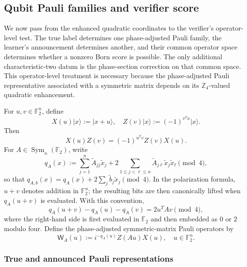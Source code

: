 \documentclass[11pt]{article}
\newcommand{\F}{\mathbb F}
\newcommand{\Sym}{\operatorname{Sym}}
\newcommand{\1}{\mathbf 1}
\newcommand{\ket}[1]{\lvert #1\rangle}
\theoremstyle{plain}
\theoremstyle{definition}
\theoremstyle{remark}
\begin{document}
\subsection{Qubit Pauli families and verifier score}
\label{subsec:integrated-qubit-verifier}
We now pass from the enhanced quadratic coordinates to the verifier's
operator-level test.  The true label determines one phase-adjusted Pauli
family, the learner's announcement determines another, and their common
operator space determines whether a nonzero Born score is possible.  The only
additional characteristic-two datum is the phase-section correction on that
common space.  This operator-level treatment is necessary because the
phase-adjusted Pauli representative associated with a symmetric matrix depends
on its $\mathbb Z_4$-valued quadratic enhancement.

For $u,v\in\F_2^n$, define
\begin{equation}
 X(u)\ket{x}:=\ket{x+u},
 \quad
 Z(v)\ket{x}:=(-1)^{v^Tx}\ket{x}.
 \label{eq:integrated-qubit-XZ}
\end{equation}
Then
\begin{equation}
 X(u)Z(v)=(-1)^{u^Tv}Z(v)X(u).
 \label{eq:integrated-qubit-XZ-commutation}
\end{equation}
For $A\in\Sym_n(\F_2)$, write
\begin{equation}
 q_A(x):=
 \sum_{j=1}^n \widetilde A_{jj}\widetilde x_j
 +2\sum_{1\le j<\ell\le n}
   \widetilde A_{j\ell}\widetilde x_j\widetilde x_\ell
 \pmod4,
 \label{eq:integrated-qubit-phase-section-enhancement}
\end{equation}
so that
$q_{A,b}(x)=q_A(x)+2\sum_j\widetilde b_j\widetilde x_j\pmod4$.
In the polarization formula, $u+v$ denotes addition in $\F_2^n$; the
resulting bits are then canonically lifted when $q_A(u+v)$ is evaluated.
With this convention,
\begin{equation}
 q_A(u+v)-q_A(u)-q_A(v)=2u^TAv\pmod4,
 \label{eq:integrated-qubit-polarization}
\end{equation}
where the right-hand side is first evaluated in $\F_2$ and then embedded as
$0$ or $2$ modulo four.
Define the phase-adjusted symmetric-matrix Pauli operators by
\begin{equation}
 \mathsf W_A(u):=i^{-q_A(u)}Z(Au)X(u),
 \quad u\in\F_2^n.
 \label{eq:integrated-qubit-symmetric-matrix-Pauli}
\end{equation}

\subsubsection{True and announced Pauli representations}
\label{subsubsec:qubit-true-announced-representations}
\end{document}

